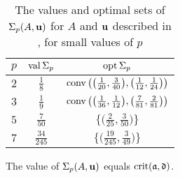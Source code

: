 \documentclass{amsart}
\begin{document}
\begin{example}
\begin{table}
\begin{center}
\begingroup
\setlength{\tabcolsep}{8pt} %
\renewcommand{\arraystretch}{1.4} %
\begin{tabular}{ccc}
  \toprule
  $p$ & $\operatorname{val} \Sigma_p$ & $\operatorname{opt} \Sigma_p$  \\
  \midrule
  $2$ & $\frac18$ & $\operatorname{conv}\big(\big(\frac1{20}, \frac3{40}\big),\big(\frac1{12}, \frac1{24}\big)\big)$ \\
  $3$ & $\frac19$ & $\operatorname{conv}\big(\big(\frac{1}{36}, \frac1{12}\big),\big(\frac7{81}, \frac2{81}\big)\big)$ \\
  $5$ & $\frac7{50}$ & $\big\{\big(\frac2{25}, \frac3{50}\big) \big\}$  \\
  $7$ & $\frac{34}{245}$ & $\big\{\big(\frac{19}{245}, \frac3{49}\big) \}$ \\
  \bottomrule
\end{tabular}
\endgroup
\end{center}
\medskip
\caption{The values and optimal sets of $\Sigma_p(A, \mathbf{u})$ for $A$ and $\mathbf{u}$ described in , for small values of $p$}
\label{table: feas fip details}
\end{table}


\end{example}


\begin{proposition}
The value of $\Sigma_p(A,\mathbf{u})$ equals $\operatorname{crit}(\mathfrak{a}, \mathfrak{d})$.
\end{proposition}
\end{document}
